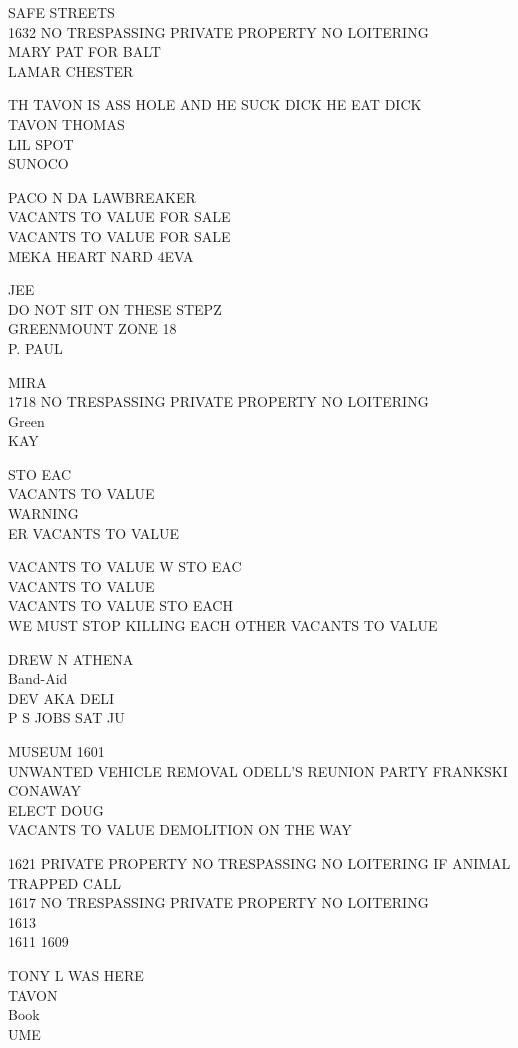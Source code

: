 \documentclass[10pt,letterpaper]{article}
\begin{document}
SAFE STREETS\\
1632 NO TRESPASSING PRIVATE PROPERTY NO LOITERING\\
MARY PAT FOR BALT\\
LAMAR CHESTER

TH TAVON IS ASS HOLE AND HE SUCK DICK HE EAT DICK\\
TAVON THOMAS\\
LIL SPOT\\
SUNOCO

PACO N DA LAWBREAKER\\
VACANTS TO VALUE FOR SALE\\
VACANTS TO VALUE FOR SALE\\
MEKA HEART NARD 4EVA

JEE\\
DO NOT SIT ON THESE STEPZ\\
GREENMOUNT ZONE 18\\
P. PAUL

MIRA\\
1718 NO TRESPASSING PRIVATE PROPERTY NO LOITERING\\
Green\\
KAY

STO EAC\\
VACANTS TO VALUE\\
WARNING\\
ER VACANTS TO VALUE

VACANTS TO VALUE W STO EAC\\
VACANTS TO VALUE\\
VACANTS TO VALUE STO EACH\\
WE MUST STOP KILLING EACH OTHER VACANTS TO VALUE

DREW N ATHENA\\
Band{-}Aid\\
DEV AKA DELI\\
P S JOBS SAT JU

MUSEUM 1601\\
UNWANTED VEHICLE REMOVAL ODELL'S REUNION PARTY FRANKSKI CONAWAY\\
ELECT DOUG\\
VACANTS TO VALUE DEMOLITION ON THE WAY

1621 PRIVATE PROPERTY NO TRESPASSING NO LOITERING IF ANIMAL TRAPPED CALL\\
1617 NO TRESPASSING PRIVATE PROPERTY NO LOITERING\\
1613\\
1611 1609

TONY L WAS HERE\\
TAVON\\
Book\\
UME
\end{document}
